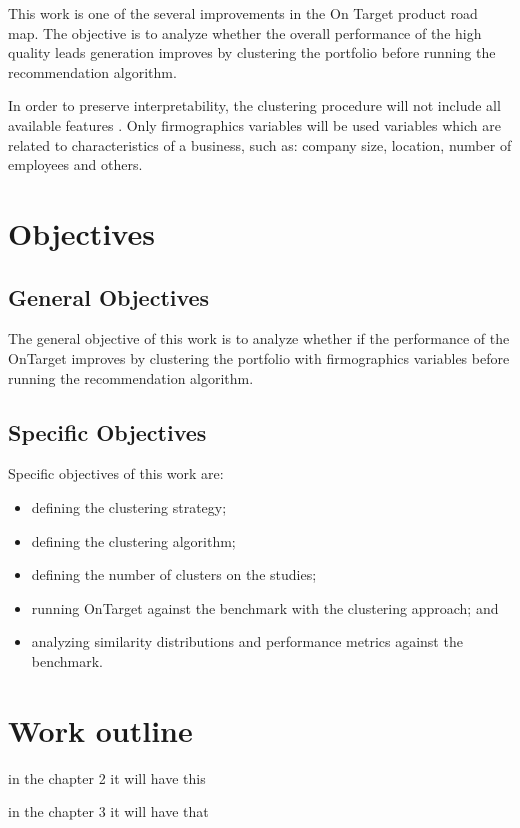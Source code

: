 This work is one of the several improvements in the On Target product road map. The objective is to analyze whether the overall performance of the high quality leads generation improves by clustering the portfolio before running the recommendation algorithm. 

In order to preserve interpretability, the clustering procedure will not include all available features . Only firmographics variables will be used\cite{wikipedia_firmographics} variables which are related to characteristics of a business, such as: company size, location, number of employees and others. 

\section{Objectives}

\subsection{General Objectives}

The general objective of this work is to analyze whether if the performance of the OnTarget improves by clustering the portfolio with firmographics variables before running the recommendation algorithm.

\subsection{Specific Objectives}

Specific objectives of this work are:

\begin{itemize}
    \item defining the clustering strategy;
	\item defining the clustering algorithm;
    \item defining the number of clusters on the studies;
    \item running OnTarget against the benchmark with the clustering approach; and
    \item analyzing similarity distributions and performance metrics against the benchmark.
\end{itemize}


\section{Work outline}

in the chapter 2 it will have this

in the chapter 3 it will have that
 